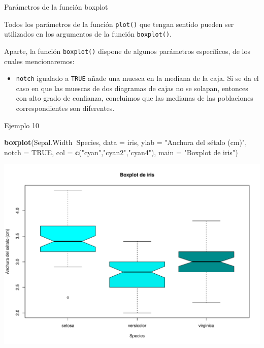 \documentclass[
  ignorenonframetext,
]{beamer}
\newenvironment{Shaded}{\begin{snugshade}}{\end{snugshade}}
\newcommand{\DataTypeTok}[1]{\textcolor[rgb]{0.13,0.29,0.53}{#1}}
\newcommand{\KeywordTok}[1]{\textcolor[rgb]{0.13,0.29,0.53}{\textbf{#1}}}
\newcommand{\NormalTok}[1]{#1}
\newcommand{\OperatorTok}[1]{\textcolor[rgb]{0.81,0.36,0.00}{\textbf{#1}}}
\newcommand{\OtherTok}[1]{\textcolor[rgb]{0.56,0.35,0.01}{#1}}
\newcommand{\StringTok}[1]{\textcolor[rgb]{0.31,0.60,0.02}{#1}}
\providecommand{\tightlist}{%
  \setlength{\itemsep}{0pt}\setlength{\parskip}{0pt}}
\begin{document}
\begin{frame}[fragile]{Parámetros de la función boxplot}
\protect\hypertarget{paruxe1metros-de-la-funciuxf3n-boxplot}{}

Todos los parámetros de la función \texttt{plot()} que tengan sentido
pueden ser utilizados en los argumentos de la función
\texttt{boxplot()}.

Aparte, la función \texttt{boxplot()} dispone de algunos parámetros
específicos, de los cuales mencionaremos:

\begin{itemize}
\tightlist
\item
  \texttt{notch} igualado a \texttt{TRUE} añade una muesca en la mediana
  de la caja. Si se da el caso en que las muescas de dos diagramas de
  cajas no se solapan, entonces con alto grado de confianza, concluimos
  que las medianas de las poblaciones correspondientes son diferentes.
\end{itemize}

\end{frame}

\begin{frame}[fragile]{Ejemplo 10}
\protect\hypertarget{ejemplo-10}{}

\begin{Shaded}
\begin{Highlighting}[]
\KeywordTok{boxplot}\NormalTok{(Sepal.Width}\OperatorTok{~}\NormalTok{Species, }\DataTypeTok{data =}\NormalTok{ iris, }\DataTypeTok{ylab =} \StringTok{"Anchura del sétalo (cm)"}\NormalTok{,}
        \DataTypeTok{notch =} \OtherTok{TRUE}\NormalTok{, }\DataTypeTok{col =} \KeywordTok{c}\NormalTok{(}\StringTok{"cyan"}\NormalTok{,}\StringTok{"cyan2"}\NormalTok{,}\StringTok{"cyan4"}\NormalTok{),}
        \DataTypeTok{main =} \StringTok{"Boxplot de iris"}\NormalTok{)}
\end{Highlighting}
\end{Shaded}

\includegraphics{Tema8.-Datos-Cuantitativos_files/figure-beamer/unnamed-chunk-30-1.pdf}

\end{frame}
\end{document}
